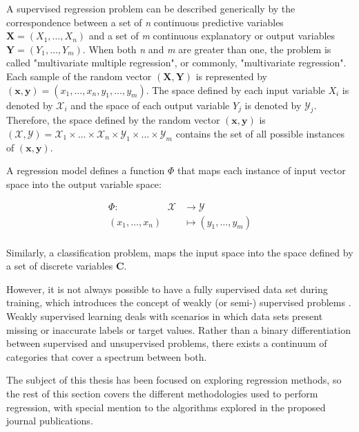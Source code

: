 A supervised regression problem can be described generically by the correspondence between a set of \textit{n} continuous predictive variables $ \mathbf{X} = (X_1, \ldots, X_n ) $ and a set of \textit{m} continuous explanatory or output variables $ \mathbf{Y} = (Y_1, \ldots, Y_m ) $. When both \textit{n} and \textit{m} are greater than one, the problem is called "multivariate multiple regression", or commonly, "multivariate regression". Each sample of the random vector $ (\mathbf{X}, \mathbf{Y}) $ is represented by $ (\mathbf{x}, \mathbf{y}) = (x_1, \ldots, x_n, y_1, \ldots, y_m ) $. The space defined by each input variable $X_i$ is denoted by $ \mathcal{X}_i$ and the space of each output variable $Y_j$ is denoted by $ \mathcal{Y}_j $. Therefore, the space defined by the random vector $ (\mathbf{x}, \mathbf{y}) $ is $ (\mathcal{X}, \mathcal{Y}) = \mathcal{X}_1 \times \ldots \times \mathcal{X}_n \times \mathcal{Y}_1 \times \ldots \times \mathcal{Y}_m $ contains the set of all possible instances of $ (\mathbf{x}, \mathbf{y}) $.

\medskip

A regression model defines a function $ \Phi $ that maps each instance of input vector space into the output variable space:

\begin{align*}
\Phi:  \qquad \qquad \quad \mathcal{X} &\rightarrow \mathcal{Y} \\
(x_1, \ldots, x_n) &\mapsto (y_1, \ldots, y_m) \\
\end{align*}

Similarly, a classification problem, maps the input space into the space defined by a set of discrete variables $ \mathbf{C} $.

\medskip

However, it is not always possible to have a fully supervised data set during training, which introduces the concept of weakly (or semi-) supervised problems \citep{chapelle2009semi,hernandez2016weak}. Weakly supervised learning deals with scenarios in which data sets present missing or inaccurate labels or target values. Rather than a binary differentiation between supervised and unsupervised problems, there exists a continuum of categories that cover a spectrum between both.

\medskip

The subject of this thesis has been focused on exploring regression methods, so the rest of this section covers the different methodologies used to perform regression, with special mention to the algorithms explored in the proposed journal publications.

